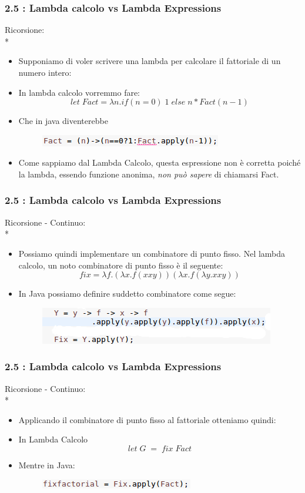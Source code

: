 \documentclass{beamer}
\begin{document}
\begin{frame}
\frametitle{\textbf{2.5 : Lambda calcolo vs Lambda Expressions}}
Ricorsione:\\*
\begin{itemize}
	\item Supponiamo di voler scrivere una lambda per calcolare il fattoriale di un numero intero:
	\item In lambda calcolo vorremmo fare: $$let\;Fact = \lambda n. if(n=0)\;1\;else\;n*Fact(n-1) $$
	\item Che in java diventerebbe
\begin{figure}
	\centering
	\includegraphics[width=0.4\linewidth]{factwrong}
	
	\label{fig:identity}
\end{figure}
\item Come sappiamo dal Lambda Calcolo, questa espressione non \`e  corretta poich\'e la lambda, essendo funzione anonima, \emph{non pu\`o sapere} di chiamarsi Fact.
\end{itemize}
\end{frame}

\begin{frame}
\frametitle{\textbf{2.5 : Lambda calcolo vs Lambda Expressions}}
Ricorsione - Continuo:\\*
\begin{itemize}
	\item Possiamo quindi implementare un combinatore di punto fisso. Nel lambda calcolo, un noto combinatore di punto fisso \`e il seguente:
$$
fix = \lambda f.(\lambda x.f(xxy))(\lambda x.f(\lambda y.xxy))
$$
	\item In Java possiamo definire suddetto combinatore come segue:
	\begin{figure}
		\centering
		\includegraphics[width=0.6\linewidth]{fix}
		\label{fig:identity}
	\end{figure}
\end{itemize}
\end{frame}

\begin{frame}
\frametitle{\textbf{2.5 : Lambda calcolo vs Lambda Expressions}}
Ricorsione - Continuo:\\*
\begin{itemize}
	\item Applicando il combinatore di punto fisso al fattoriale otteniamo quindi:
	\item In Lambda Calcolo
	$$
	let\; G\;=\;fix\;Fact
	$$
	\item Mentre in Java:
	\begin{figure}
		\centering
		\includegraphics[width=0.6\linewidth]{factok}
		\label{fig:identity}
	\end{figure}
\end{itemize}
\end{frame}
\end{document}
